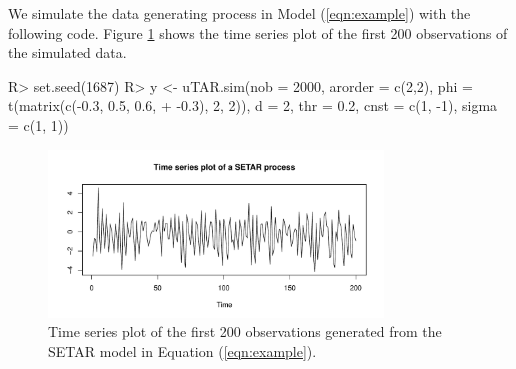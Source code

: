 We simulate the data generating process in Model (\ref{eqn:example}) with the following code. Figure \ref{fig:SETAR} shows the time series plot of the first 200 observations of the simulated data. 

\begin{example}
R> set.seed(1687)
R> y <- uTAR.sim(nob = 2000, arorder = c(2,2), phi = t(matrix(c(-0.3, 0.5, 0.6,
+    -0.3), 2, 2)), d = 2, thr = 0.2, cnst = c(1, -1), sigma = c(1, 1))
\end{example}
\begin{figure}[ht!]
\centering
\includegraphics[width=3.5in]{SETAR}
\caption{Time series plot of the first 200 observations generated from the SETAR model in Equation (\ref{eqn:example}).}
\label{fig:SETAR}
\end{figure}


